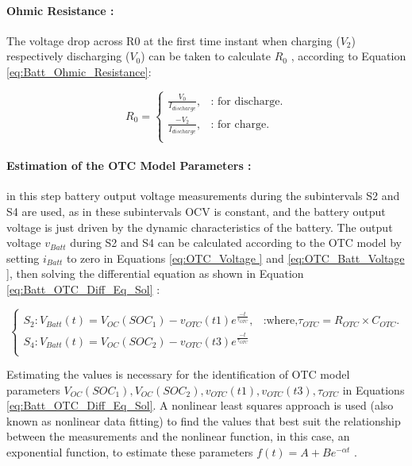 \paragraph{Ohmic Resistance :} 
The voltage drop across R0 at the 
first time instant when charging ($V_2$) respectively 
discharging ($V_0$) can be taken to calculate $R_0$ \cite{Internal_Resistance_LIPO_Batt_Gogoana}, according 
to Equation \ref{eq:Batt_Ohmic_Resistance}: 

\begin{equation}\label{eq:Batt_Ohmic_Resistance}
	R_0 =\begin{cases}
	  \frac{V_0}{I_{discharge}}, & \text{: for discharge}.\\
	  \frac{- V_2}{I_{discharge}}, & \text{: for charge}.\\
	\end{cases}
\end{equation}

\paragraph{Estimation of the OTC Model Parameters :} 
in this step 
battery output voltage measurements during the 
subintervals S2 and S4 are used, as in these subintervals 
OCV is constant\cite{Internal_Resistance_LIPO_Batt_Gogoana}, and the battery output voltage is just 
driven by the dynamic characteristics of the battery. The 
output voltage $v_{Batt}$ during S2 and S4 can be calculated 
according to the OTC model by setting $i_{Batt}$ to zero in 
Equations \ref{eq:OTC_Voltage } and \ref{eq:OTC_Batt_Voltage }, then solving the differential equation as 
shown in Equation \ref{eq:Batt_OTC_Diff_Eq_Sol} \cite {UKEMPT_AHMAD2012}:

\begin{equation}\label{eq:Batt_OTC_Diff_Eq_Sol}
	\begin{cases}
	  S_2 : V_{Batt}(t) = V_{OC}(SOC_1) - v_{OTC}(t1) e^{\frac{-t}{\tau_{OTC}}} , & \text{:where,} \tau_{OTC} = R_{OTC}\times C_{OTC}.\\
	  S_4 : V_{Batt}(t) = V_{OC}(SOC_2) - v_{OTC}(t3) e^{\frac{-t}{\tau_{OTC}}}\\
	\end{cases}
\end{equation}

Estimating the values is necessary for the identification of OTC model parameters $V_{OC}(SOC_1),V_{OC}(SOC_2),v_{OTC}(t1),v_{OTC}(t3), \tau_{OTC}$  
in Equations \ref{eq:Batt_OTC_Diff_Eq_Sol}. A nonlinear least squares approach is used (also known as nonlinear data fitting) to find the values that best suit the relationship between the measurements and the nonlinear function, in this case, an exponential function, to estimate these parameters
$f(t) = A + Be^{-\alpha t}$ . \\

